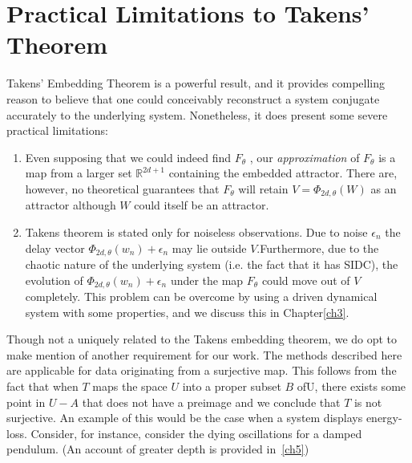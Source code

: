 \documentclass[a4paper,12pt,twoside]{report}
\begin{document}
\section{Practical Limitations to Takens' Theorem}
Takens' Embedding Theorem is a powerful result, and it provides compelling reason to believe that one could conceivably reconstruct a system conjugate accurately to the underlying system. 
Nonetheless, it does present some severe practical limitations:
\vspace{-5mm}
\begin{enumerate}
\item Even supposing that we could indeed find $F_\theta$ , our \emph{approximation} of  $F_\theta$ is a map from a larger set $\mathbb{R}^{2d+1}$ containing the embedded attractor. There are, however, no theoretical guarantees that $F_\theta$ will retain  $V=\Phi_{2d,\theta}(W)$  as an attractor although $W$ could itself be an attractor.
\item Takens theorem is stated only for noiseless observations. Due to noise $\epsilon_n$ the delay vector $\Phi_{2d,\theta}(w_n) + \epsilon_n$  may lie outside $V$.Furthermore, due to the chaotic nature of the underlying system (i.e. the fact that it has SIDC), the evolution of $\Phi_{2d,\theta}(w_n) + \epsilon_n$ under the map $F_\theta$ could move out of $V$ completely. This problem can be overcome  by using a driven dynamical system with some properties, and we discuss this in Chapter\ref{ch3}. 
\end{enumerate}



Though not a uniquely related to the Takens embedding theorem, we do opt to make mention of another requirement for our work. 
The methods described here are applicable for data originating from a surjective map. 
This follows from the fact that when $T$ maps the space $U$ into a proper subset $B$ of$ $U, there exists some point in $U - A$ that does not have a preimage and we conclude that $T$ is not surjective. 
An example of this would be the case when a system displays energy-loss. Consider, for instance, consider the dying oscillations for a damped pendulum. (An account of greater depth  is provided in~\ref{ch5})
\end{document}
